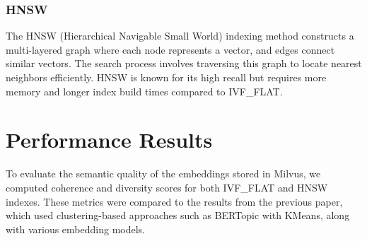\documentclass[12pt]{article}
\begin{document}
    \subsubsection{HNSW}
    The HNSW (Hierarchical Navigable Small World) indexing method constructs a multi-layered graph where each node represents a vector, and edges connect similar vectors. The search process involves traversing this graph to locate nearest neighbors efficiently. HNSW is known for its high recall but requires more memory and longer index build times compared to IVF\_FLAT.
    
    
    
    \section{Performance Results}
    
    To evaluate the semantic quality of the embeddings stored in Milvus, we computed coherence and diversity scores for both IVF\_FLAT and HNSW indexes. 
    These metrics were compared to the results from the previous paper, which used clustering-based approaches such as BERTopic with KMeans, along with various embedding models.
\end{document}

